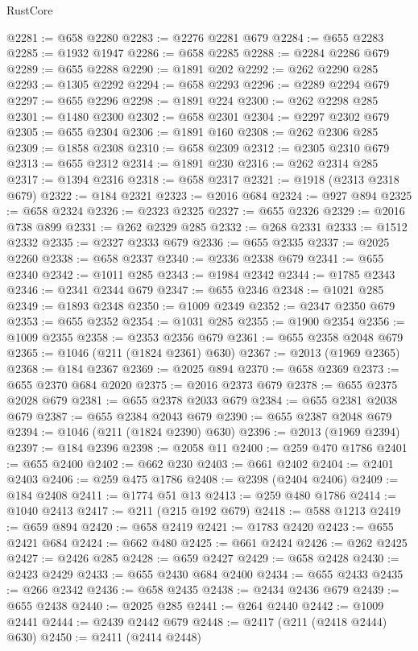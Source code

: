 \begin{lexlean}{RustCore}
\begin{coremodule}
@2281 := @658 @2280
@2283 := @2276 @2281 @679
@2284 := @655 @2283
@2285 := @1932 @1947
@2286 := @658 @2285
@2288 := @2284 @2286 @679
@2289 := @655 @2288
@2290 := @1891 @202
@2292 := @262 @2290 @285
@2293 := @1305 @2292
@2294 := @658 @2293
@2296 := @2289 @2294 @679
@2297 := @655 @2296
@2298 := @1891 @224
@2300 := @262 @2298 @285
@2301 := @1480 @2300
@2302 := @658 @2301
@2304 := @2297 @2302 @679
@2305 := @655 @2304
@2306 := @1891 @160
@2308 := @262 @2306 @285
@2309 := @1858 @2308
@2310 := @658 @2309
@2312 := @2305 @2310 @679
@2313 := @655 @2312
@2314 := @1891 @230
@2316 := @262 @2314 @285
@2317 := @1394 @2316
@2318 := @658 @2317
@2321 := @1918 (@2313 @2318 @679)
@2322 := @184 @2321
@2323 := @2016 @684
@2324 := @927 @894
@2325 := @658 @2324
@2326 := @2323 @2325
@2327 := @655 @2326
@2329 := @2016 @738 @899
@2331 := @262 @2329 @285
@2332 := @268 @2331
@2333 := @1512 @2332
@2335 := @2327 @2333 @679
@2336 := @655 @2335
@2337 := @2025 @2260
@2338 := @658 @2337
@2340 := @2336 @2338 @679
@2341 := @655 @2340
@2342 := @1011 @285
@2343 := @1984 @2342
@2344 := @1785 @2343
@2346 := @2341 @2344 @679
@2347 := @655 @2346
@2348 := @1021 @285
@2349 := @1893 @2348
@2350 := @1009 @2349
@2352 := @2347 @2350 @679
@2353 := @655 @2352
@2354 := @1031 @285
@2355 := @1900 @2354
@2356 := @1009 @2355
@2358 := @2353 @2356 @679
@2361 := @655 @2358 @2048 @679
@2365 := @1046 (@211 (@1824 @2361) @630)
@2367 := @2013 (@1969 @2365)
@2368 := @184 @2367
@2369 := @2025 @894
@2370 := @658 @2369
@2373 := @655 @2370 @684 @2020
@2375 := @2016 @2373 @679
@2378 := @655 @2375 @2028 @679
@2381 := @655 @2378 @2033 @679
@2384 := @655 @2381 @2038 @679
@2387 := @655 @2384 @2043 @679
@2390 := @655 @2387 @2048 @679
@2394 := @1046 (@211 (@1824 @2390) @630)
@2396 := @2013 (@1969 @2394)
@2397 := @184 @2396
@2398 := @2058 @11
@2400 := @259 @470 @1786
@2401 := @655 @2400
@2402 := @662 @230
@2403 := @661 @2402
@2404 := @2401 @2403
@2406 := @259 @475 @1786
@2408 := @2398 (@2404 @2406)
@2409 := @184 @2408
@2411 := @1774 @51 @13
@2413 := @259 @480 @1786
@2414 := @1040 @2413
@2417 := @211 (@215 @192 @679)
@2418 := @588 @1213
@2419 := @659 @894
@2420 := @658 @2419
@2421 := @1783 @2420
@2423 := @655 @2421 @684
@2424 := @662 @480
@2425 := @661 @2424
@2426 := @262 @2425
@2427 := @2426 @285
@2428 := @659 @2427
@2429 := @658 @2428
@2430 := @2423 @2429
@2433 := @655 @2430 @684 @2400
@2434 := @655 @2433
@2435 := @266 @2342
@2436 := @658 @2435
@2438 := @2434 @2436 @679
@2439 := @655 @2438
@2440 := @2025 @285
@2441 := @264 @2440
@2442 := @1009 @2441
@2444 := @2439 @2442 @679
@2448 := @2417 (@211 (@2418 @2444) @630)
@2450 := @2411 (@2414 @2448)

\end{coremodule}
\end{lexlean}
